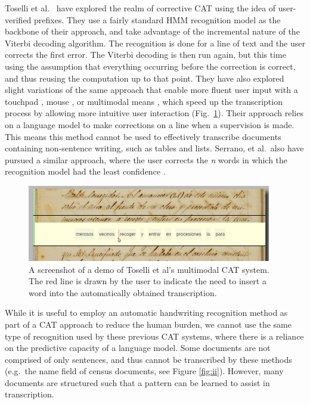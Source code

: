 \documentclass[ms,electronic,twosidetoc,letterpaper,chaptercenter,parttop,lol,lof,lot]{byumsphd}
\begin{document}
Toselli et al.~\cite{Toselli2007} have explored the realm of corrective CAT using the idea of user-verified prefixes. They use a fairly standard HMM recognition model as the backbone of their approach, and take advantage of the incremental nature of the Viterbi decoding algorithm. The recognition is done for a line of text and the user corrects the first error. The Viterbi decoding is then run again, but this time using the assumption that everything occurring before the correction is correct, and thus reusing the computation up to that point. They have also explored slight variations of the same approach that enable more fluent user input with a touchpad \cite{Toselli2008}, mouse \cite{Toselli2009}, or multimodal means \cite{Toselli2010}, which speed up the transcription process by allowing more intuitive user interaction (Fig.~\ref{fig:Toselli_multimodalCAT}). Their approach relies on a language model to make corrections on a line when a supervision is made. This means this method cannot be used to effectively transcribe documents containing non-sentence writing, such as tables and lists. Serrano, et al.~also have pursued a similar approach, where the user corrects the \textit{n} words in which the recognition model had the least confidence \cite{Serrano2014}.

\begin{figure}
    \centering
    \includegraphics[width=0.95\textwidth]{Toselli_multimodalCAT}
    \caption{A screenshot of a demo of Toselli et al's multimodal CAT system. The red line is drawn by the user to indicate the need to insert a word into the automatically obtained transcription.}
    \label{fig:Toselli_multimodalCAT}
\end{figure}

While it is useful to employ an automatic handwriting recognition method as part of a CAT approach to reduce the human burden, we cannot use the same type of recognition used by these previous CAT systems, where there is a reliance on the predictive capacity of a language model. Some documents are not comprised of only sentences, and thus cannot be transcribed by these methods (e.g.~the name field of census documents, see Figure \ref{fig:ii}). However, many documents are structured such that a pattern can be learned to assist in transcription.
\end{document}
